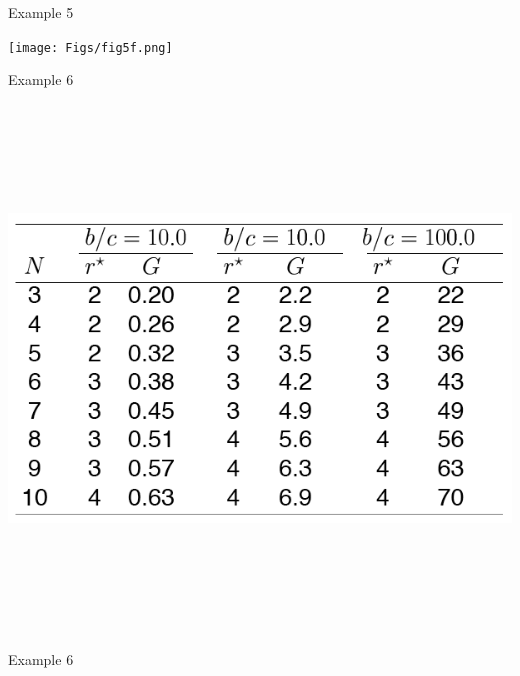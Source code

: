 \documentclass[12pt]{article}
\newcommand{\headsize}{\fontsize{35}{35} \selectfont}
\begin{document}
\headsize \color{myyellow}
\hfill \begin{minipage}{5.75in}
\centering
Example 5
\end{minipage}

\vspace{30mm}

\centerline{\texttt{[image: Figs/fig5f.png]}}


\newpage


\headsize \color{myyellow}
\hfill \begin{minipage}{5.75in}
\centering
Example 6
\end{minipage}

\vspace{30mm}

\centerline{\includegraphics[height=5.5in]{Figs/tableA.png}}


\newpage


\headsize \color{myyellow}
\hfill \begin{minipage}{5.75in}
\centering
Example 6
\end{minipage}

\vspace{30mm}
\end{document}

